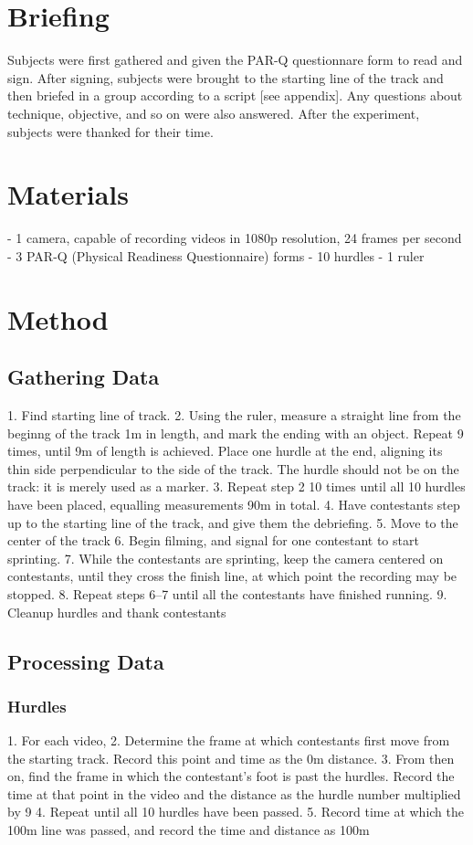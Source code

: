 \documentclass[index]{subfiles}
\begin{document}
\section{Briefing}
Subjects were first gathered and given the PAR-Q questionnare form to read and sign. After signing, subjects were brought to the starting line of the track and then briefed in a group according to a script [see appendix]. Any questions about technique, objective, and so on were also answered. After the experiment, subjects were thanked for their time.

\section{Materials}
- 1 camera, capable of recording videos in 1080p resolution, 24 frames per second
- 3 PAR-Q (Physical Readiness Questionnaire) forms
- 10 hurdles
- 1 ruler

\section{Method}
\subsection{Gathering Data}
1. Find starting line of track.
2. Using the ruler, measure a straight line from the beginng of the track 1m in length, and mark the ending with an object. Repeat 9 times, until 9m of length is achieved. Place one hurdle at the end, aligning its thin side perpendicular to the side of the track. The hurdle should not be on the track: it is merely used as a marker.
3. Repeat step 2 10 times until all 10 hurdles have been placed, equalling measurements 90m in total.
4. Have contestants step up to the starting line of the track, and give them the debriefing.
5. Move to the center of the track
6. Begin filming, and signal for one contestant to start sprinting.
7. While the contestants are sprinting, keep the camera centered on contestants, until they cross the finish line, at which point the recording may be stopped.
8. Repeat steps 6--7 until all the contestants have finished running.
9. Cleanup hurdles and thank contestants
\subsection{Processing Data}
\subsubsection{Hurdles}
1. For each video,
2. Determine the frame at which contestants first move from the starting track. Record this point and time as the 0m distance.
3. From then on, find the frame in which the contestant's foot is past the hurdles. Record the time at that point in the video and the distance as the hurdle number multiplied by 9
4. Repeat until all 10 hurdles have been passed.
5. Record time at which the 100m line was passed, and record the time and distance as 100m
\end{document}
